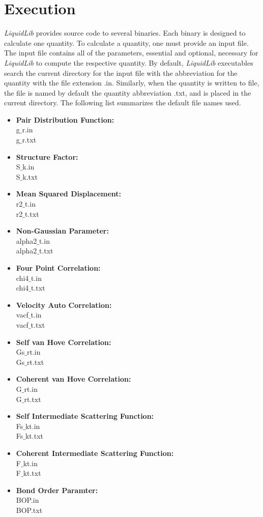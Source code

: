 \documentclass{article}
\begin{document}
\section{Execution}
\textit{LiquidLib} provides source code to several binaries.  Each binary is designed to calculate one quantity.  To calculate a quantity, one must provide an input file.  The input file contains all of the parameters, essential and optional, necessary for \textit{LiquidLib} to compute the respective quantity.  By default, \textit{LiquidLib} executables search the current directory for the input file with the abbreviation for the quantity with the file extension .in.  Similarly, when the quantity is written to file, the file is named by default the quantity abbreviation .txt, and is placed in the current directory.  The following list summarizes the default file names used.
\begin{multicols}{2} \label{input_output}
\begin{itemize}
\item \textbf{Pair Distribution Function:}
 \\g$\_$r.in
 \\g$\_$r.txt
\item \textbf{Structure Factor:}
 \\S$\_$k.in
 \\S$\_$k.txt
\item \textbf{Mean Squared Displacement:}
 \\r2$\_$t.in
 \\r2$\_$t.txt
\item \textbf{Non-Gaussian Parameter:}
 \\alpha2$\_$t.in
 \\alpha2$\_$t.txt
 \item \textbf{Four Point Correlation:}
 \\chi4$\_$t.in
 \\chi4$\_$t.txt
 \item \textbf{Velocity Auto Correlation:}
 \\vacf$\_$t.in
 \\vacf$\_$t.txt
  \item \textbf{Self van Hove Correlation:}
 \\Gs$\_$rt.in
 \\Gs$\_$rt.txt
 \item \textbf{Coherent van Hove Correlation:}
 \\G$\_$rt.in
 \\G$\_$rt.txt
\item \textbf{Self Intermediate Scattering Function:}
 \\Fs$\_$kt.in
 \\Fs$\_$kt.txt
\item \textbf{Coherent Intermediate Scattering Function:}
\\F$\_$kt.in
\\F$\_$kt.txt
\item \textbf{Bond Order Paramter:}
\\BOP.in
\\BOP.txt
\end{itemize}
\end{multicols}
\end{document}
